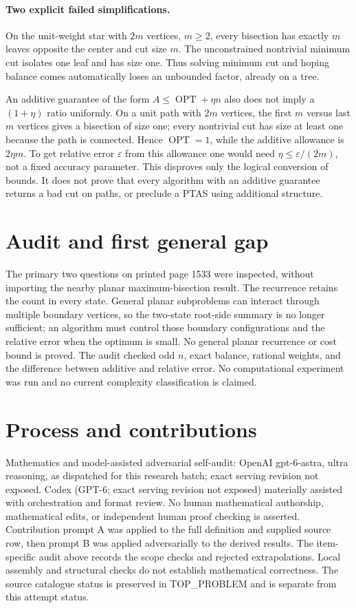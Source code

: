 \documentclass[11pt]{article}
\begin{document}
\paragraph{Two explicit failed simplifications.}
On the unit-weight star with $2m$ vertices, $m\ge2$, every
bisection has exactly $m$ leaves opposite the center and cut size
$m$. The unconstrained nontrivial minimum cut isolates one leaf
and has size one. Thus solving minimum cut and hoping balance
comes automatically loses an unbounded factor, already on a tree.

An additive guarantee of the form
$A\le\operatorname{OPT}+\eta n$ also does not imply a
$(1+\eta)$ ratio uniformly. On a unit path with $2m$ vertices,
the first $m$ versus last $m$ vertices gives a bisection of
size one; every nontrivial cut has size at least one because the
path is connected. Hence $\operatorname{OPT}=1$, while the
additive allowance is $2\eta m$. To get relative error
$\varepsilon$ from this allowance one would need
$\eta\le\varepsilon/(2m)$, not a fixed accuracy parameter.
This disproves only the logical conversion of bounds. It does not
prove that every algorithm with an additive guarantee returns a bad
cut on paths, or preclude a PTAS using additional structure.

\section{Audit and first general gap}
The primary two questions on printed page 1533 were inspected,
without importing the nearby planar maximum-bisection result.
The recurrence retains the count in every state. General planar
subproblems can interact through multiple boundary vertices, so the
two-state root-side summary is no longer sufficient; an algorithm
must control those boundary configurations and the relative error
when the optimum is small. No general planar recurrence or cost
bound is proved. The audit checked odd $n$, exact balance, rational
weights, and the difference between additive and relative error.
No computational experiment was run and no current complexity
classification is claimed.

\section{Process and contributions}
Mathematics and model-assisted adversarial self-audit: OpenAI gpt-6-astra, ultra reasoning, as dispatched for this research batch; exact serving revision not exposed. Codex (GPT-6; exact serving revision not exposed) materially assisted with orchestration and format review. No human mathematical authorship, mathematical edits, or independent human proof checking is asserted.
Contribution prompt A was applied to the full definition and supplied source row, then prompt B was applied adversarially to the derived results. The item-specific audit above records the scope checks and rejected extrapolations. Local assembly and structural checks do not establish mathematical correctness. The source catalogue status is preserved in TOP\_PROBLEM and is separate from this attempt status.
\end{document}
